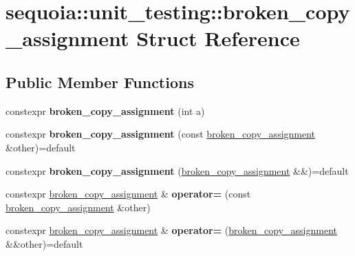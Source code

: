 \hypertarget{structsequoia_1_1unit__testing_1_1broken__copy__assignment}{}\section{sequoia\+::unit\+\_\+testing\+::broken\+\_\+copy\+\_\+assignment Struct Reference}
\label{structsequoia_1_1unit__testing_1_1broken__copy__assignment}
\subsection*{Public Member Functions}
\begin{DoxyCompactItemize}
\item 
\mbox{\label{structsequoia_1_1unit__testing_1_1broken__copy__assignment_ad7a2c50a3afeedf9b4675d8aca642d45}} 
constexpr {\bfseries broken\+\_\+copy\+\_\+assignment} (int a)
\item 
\mbox{\label{structsequoia_1_1unit__testing_1_1broken__copy__assignment_a7e8ebb858c4f827a0da4e3c5bdc6395e}} 
constexpr {\bfseries broken\+\_\+copy\+\_\+assignment} (const \mbox{\hyperlink{structsequoia_1_1unit__testing_1_1broken__copy__assignment}{broken\+\_\+copy\+\_\+assignment}} \&other)=default
\item 
\mbox{\label{structsequoia_1_1unit__testing_1_1broken__copy__assignment_aa7cc1677b56d819d8847055fed7413a2}} 
constexpr {\bfseries broken\+\_\+copy\+\_\+assignment} (\mbox{\hyperlink{structsequoia_1_1unit__testing_1_1broken__copy__assignment}{broken\+\_\+copy\+\_\+assignment}} \&\&)=default
\item 
\mbox{\label{structsequoia_1_1unit__testing_1_1broken__copy__assignment_ac62062599d724bd5724ec2804b52269c}} 
constexpr \mbox{\hyperlink{structsequoia_1_1unit__testing_1_1broken__copy__assignment}{broken\+\_\+copy\+\_\+assignment}} \& {\bfseries operator=} (const \mbox{\hyperlink{structsequoia_1_1unit__testing_1_1broken__copy__assignment}{broken\+\_\+copy\+\_\+assignment}} \&other)
\item 
\mbox{\label{structsequoia_1_1unit__testing_1_1broken__copy__assignment_a2bc1f56f9a3eb6e6295e5633873d987b}} 
constexpr \mbox{\hyperlink{structsequoia_1_1unit__testing_1_1broken__copy__assignment}{broken\+\_\+copy\+\_\+assignment}} \& {\bfseries operator=} (\mbox{\hyperlink{structsequoia_1_1unit__testing_1_1broken__copy__assignment}{broken\+\_\+copy\+\_\+assignment}} \&\&other)=default
\end{DoxyCompactItemize}
